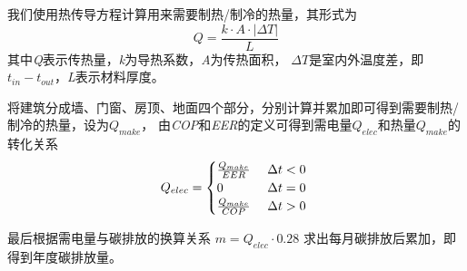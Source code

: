 \documentclass[a4paper, 12pt]{article}
\numberwithin{equation}{section}
\begin{document}
            我们使用热传导方程计算用来需要制热/制冷的热量，其形式为
            \begin{equation}
                Q = \frac{k \cdot A \cdot |\Delta T|}{L}
            \end{equation}
            其中\textit{Q}表示传热量，\textit{k}为导热系数，\textit{A}为传热面积，
            $ \Delta T $是室内外温度差，即$ t_{in} - t_{out} $，\textit{L}表示材料厚度。

            将建筑分成墙、门窗、房顶、地面四个部分，分别计算并累加即可得到需要制热/制冷的热量，设为$ Q_{make} $，
            由\textit{COP}和\textit{EER}的定义可得到需电量$ Q_{elec} $和热量$ Q_{make} $的转化关系
            \begin{equation}
                Q_{elec} =
                \begin{cases}
                    \frac{Q_{make}}{EER} & \text{ $ \Delta t < 0 $ } \\
                    0 & \text{ $ \Delta t = 0 $ } \\
                    \frac{Q_{make}}{COP} & \text{ $ \Delta t > 0 $ }
                \end{cases}
            \end{equation}

            最后根据需电量与碳排放的换算关系 $ m = Q_{elec} \cdot 0.28 $ 求出每月碳排放后累加，即得到年度碳排放量。


    {}


    {}


    {}


    {}


    {}
\end{document}
